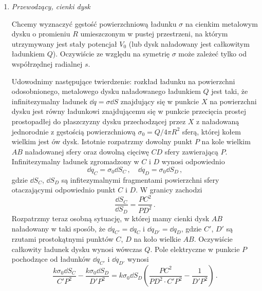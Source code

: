 \documentclass[../main.tex]{subfiles}
\begin{document}
\begin{enumerate}
    \item \textit{Przewodzący, cienki dysk}
    \medskip
    
    Chcemy wyznaczyć gęstość powierzchniową ładunku \(\sigma\) na cienkim metalowym dysku o promieniu \(R\) umieszczonym w pustej przestrzeni, na którym utrzymywany jest stały potencjał \(V_0\) (lub dysk naładowany jest całkowitym ładunkiem \(Q\)). Oczywiście ze względu na symetrię \(\sigma\) może zależeć tylko od współrzędnej radialnej \(s\).
    \medskip
    
    Udowodnimy następujące twierdzenie: rozkład ładunku na powierzchni odosobnionego, metalowego dysku naładowanego ładunkiem \(Q\) jest taki, że infinitezymalny ładunek \(\dd{q}=\sigma \dd{S}\) znajdujący się w punkcie \(X\) na powierzchni dysku jest równy ładunkowi znajdującemu się w punkcie przecięcia prostej prostopadłej do płaszczyzny dysku przechodzącej przez \(X\) z naładowaną jednorodnie z gęstością powierzchniową \(\sigma_0=Q/4\pi R^2\) sferą, której kołem wielkim jest ów dysk. Istotnie rozpatrzmy dowolny punkt \(P\) na kole wielkim \(AB\) naładowanej sfery oraz dowolną cięciwę \(CD\) sfery zawierającą \(P\). Infinitezymalny ładunek zgromadzony w \(C\) i \(D\) wynosi odpowiednio
    \begin{equation*}
        \dd{q}_C=\sigma_0\dd{S}_C\,,\quad \dd{q}_D=\sigma_0\dd{S}_D\,,
    \end{equation*}
    gdzie \(\dd{S}_C\), \(\dd{S}_D\) są infitezymalnymi fragmentami powierzchni sfery otaczającymi odpowiednio punkt \(C\) i \(D\). W granicy zachodzi
    \begin{equation*}
        \frac{\dd{S}_C}{\dd{S_D}}=\frac{PC^2}{PD^2}\,.
    \end{equation*}
    Rozpatrzmy teraz osobną sytuację, w której mamy cienki dysk \(AB\) naładowany w taki sposób, że \(\dd{q}_{C'}=\dd{q}_C\) i \(\dd{q}_{D'}=\dd{q}_D\), gdzie \(C'\), \(D'\) są rzutami prostokątnymi punktów \(C\), \(D\) na koło wielkie \(AB\). Oczywiście całkowity ładunek dysku wynosi wówczas \(Q\). Pole elektryczne w punkcie \(P\) pochodzące od ładunków \(\dd{q}_{C'}\) i \(\dd{q}_{D'}\) wynosi
    \begin{equation*}
        \frac{k\sigma_0\dd{S}_C}{C'P^2}-\frac{k\sigma_0\dd{S}_D}{D'P^2}=k\sigma_0\dd{S}_D\left(\frac{PC^2}{PD^2\cdot C'P^2}-\frac{1}{D'P^2}\right)\,.
    \end{equation*}
    

\end{enumerate}
\end{document}
